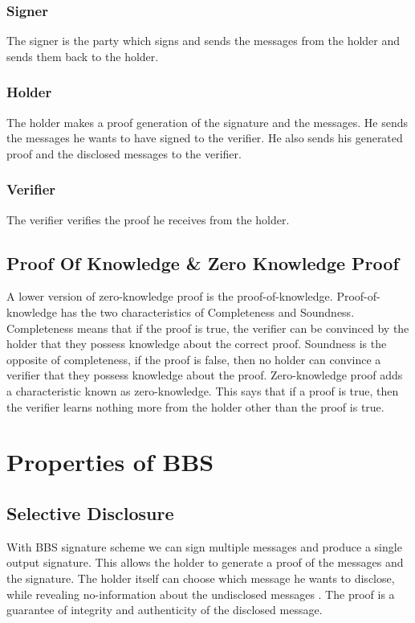 \documentclass{article}
\begin{document}
\subsubsection{Signer}
The signer is the party which signs and sends the messages from the holder and sends them back to the holder.

\subsubsection{Holder}
The holder makes a proof generation of the signature and the messages. He sends the messages he wants to have signed to the verifier. He also sends his generated proof and the disclosed messages to the verifier.

\subsubsection{Verifier}
The verifier verifies the proof he receives from the holder.



\subsection{Proof Of Knowledge \& Zero Knowledge Proof}

A lower version of zero-knowledge proof is the proof-of-knowledge. Proof-of-knowledge has the two characteristics of Completeness and Soundness. Completeness means that if the proof is true, the verifier can be convinced by the holder that they possess knowledge about the correct proof. Soundness is the opposite of completeness, if the proof is false, then no holder can convince a verifier that they possess knowledge about the proof. Zero-knowledge proof adds a characteristic known as zero-knowledge. This says that if a proof is true, then the verifier learns nothing more from the holder other than the proof is true. \cite{zero-knowledge-proofs}


\section{Properties of BBS}

\subsection{Selective Disclosure}

With BBS signature scheme we can sign multiple messages and produce a single output signature. This allows the holder to generate a proof of the messages and the signature. The holder itself can choose which message he wants to disclose, while revealing no-information about the undisclosed messages . The proof is a guarantee of integrity and authenticity of the disclosed message. \cite{bbs-signature-identity}
\end{document}
